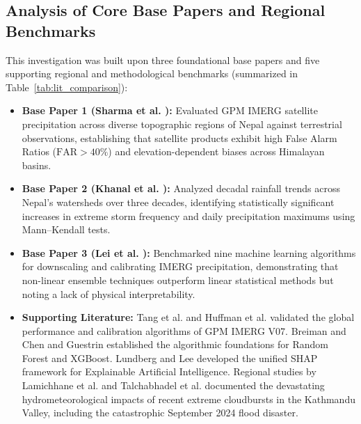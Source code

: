 \documentclass[conference]{IEEEtran}
\begin{document}
\subsection{Analysis of Core Base Papers and Regional Benchmarks}
This investigation was built upon three foundational base papers and five supporting regional and methodological benchmarks (summarized in Table~\ref{tab:lit_comparison}):
\begin{itemize}
    \item \textbf{Base Paper 1 (Sharma et al. \cite{sharma2020}):} Evaluated GPM IMERG satellite precipitation across diverse topographic regions of Nepal against terrestrial observations, establishing that satellite products exhibit high False Alarm Ratios ($\text{FAR} > 40\%$) and elevation-dependent biases across Himalayan basins.
    \item \textbf{Base Paper 2 (Khanal et al. \cite{khanal2024}):} Analyzed decadal rainfall trends across Nepal's watersheds over three decades, identifying statistically significant increases in extreme storm frequency and daily precipitation maximums using Mann--Kendall tests.
    \item \textbf{Base Paper 3 (Lei et al. \cite{lei2025}):} Benchmarked nine machine learning algorithms for downscaling and calibrating IMERG precipitation, demonstrating that non-linear ensemble techniques outperform linear statistical methods but noting a lack of physical interpretability.
    \item \textbf{Supporting Literature:} Tang et al. \cite{Tang2020} and Huffman et al. \cite{Huffman2020} validated the global performance and calibration algorithms of GPM IMERG V07. Breiman \cite{Breiman2001} and Chen and Guestrin \cite{Chen2016} established the algorithmic foundations for Random Forest and XGBoost. Lundberg and Lee \cite{Lundberg2017} developed the unified SHAP framework for Explainable Artificial Intelligence. Regional studies by Lamichhane et al. \cite{lamichhane2025} and Talchabhadel et al. \cite{talchabhadel2022} documented the devastating hydrometeorological impacts of recent extreme cloudbursts in the Kathmandu Valley, including the catastrophic September 2024 flood disaster.
\end{itemize}
\end{document}
